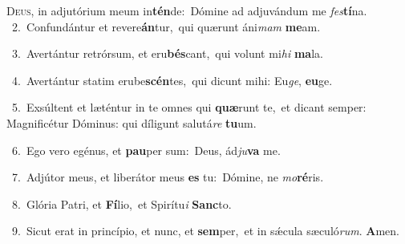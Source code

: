 \lettrine{\initial\textcolor{\initialcolor}{D}}{eus,} in adjutórium meum in\-\textbf{tén}\-de:~\star Dómine ad adjuvándum me \textit{fes}\-\textbf{tí}na.\\
{\numbfont\textcolor{\numbcolor}{~2.}}~Confundántur et revere\-\textbf{án}\-tur,~\star qui quærunt áni\textit{mam} \textbf{me}\-am.\par
{\numbfont\textcolor{\numbcolor}{~3.}}~Avertántur retrórsum, et eru\-\textbf{bés}\-cant,~\star qui volunt mi\textit{hi} \textbf{ma}\-la.\par
{\numbfont\textcolor{\numbcolor}{~4.}}~Avertántur statim erube\-\textbf{scén}\-tes,~\star qui dicunt mihi: Eu\-\textit{ge}\-, \textbf{eu}\-ge.\par
{\numbfont\textcolor{\numbcolor}{~5.}}~Exsúltent et læténtur in te omnes qui \textbf{quæ}\-runt te,~\star et dicant semper: Magnificétur Dóminus: qui díligunt salutá\textit{re} \textbf{tu}\-um.\par
{\numbfont\textcolor{\numbcolor}{~6.}}~Ego vero egénus, et \textbf{pau}\-per sum:~\star Deus, ád\-\textit{ju}\-\textbf{va} me.\par
{\numbfont\textcolor{\numbcolor}{~7.}}~Adjútor meus, et liberátor meus \textbf{es} tu:~\star Dómine, ne \textit{mo}\-\textbf{ré}ris.\par
{\numbfont\textcolor{\numbcolor}{~8.}}~Glória Patri, et \textbf{Fí}\-lio,~\star et Spirítu\textit{i} \textbf{Sanc}\-to.\par
{\numbfont\textcolor{\numbcolor}{~9.}}~Sicut erat in princípio, et nunc, et \textbf{sem}\-per,~\star et in sǽcula sæculó\-\textit{rum}\-. \textbf{A}\-men.\par
